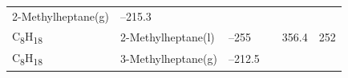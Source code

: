 \documentclass[
]{book}
\theoremstyle{definition}
\theoremstyle{definition}
\theoremstyle{definition}
\theoremstyle{remark}
\begin{document}
\begin{longtable}[]{@{}llllll@{}}
\begin{minipage}[t]{0.17\columnwidth}
2-Methylheptane(g)\strut
\end{minipage} & \begin{minipage}[t]{0.15\columnwidth}\raggedright
--215.3\strut
\end{minipage} & \begin{minipage}[t]{0.15\columnwidth}\raggedright
\strut
\end{minipage} & \begin{minipage}[t]{0.14\columnwidth}\raggedright
\strut
\end{minipage} & \begin{minipage}[t]{0.14\columnwidth}\raggedright
\strut
\end{minipage}\tabularnewline
\begin{minipage}[t]{0.07\columnwidth}\raggedright
C\textsubscript{8}H\textsubscript{18}\strut
\end{minipage} & \begin{minipage}[t]{0.17\columnwidth}\raggedright
2-Methylheptane(l)\strut
\end{minipage} & \begin{minipage}[t]{0.15\columnwidth}\raggedright
--255\strut
\end{minipage} & \begin{minipage}[t]{0.15\columnwidth}\raggedright
\strut
\end{minipage} & \begin{minipage}[t]{0.14\columnwidth}\raggedright
356.4\strut
\end{minipage} & \begin{minipage}[t]{0.14\columnwidth}\raggedright
252\strut
\end{minipage}\tabularnewline
\begin{minipage}[t]{0.07\columnwidth}\raggedright
C\textsubscript{8}H\textsubscript{18}\strut
\end{minipage} & \begin{minipage}[t]{0.17\columnwidth}\raggedright
3-Methylheptane(g)\strut
\end{minipage} & \begin{minipage}[t]{0.15\columnwidth}\raggedright
--212.5\strut
\end{minipage} & \begin{minipage}[t]{0.15\columnwidth}\raggedright
\strut
\end{minipage} & \begin{minipage}[t]{0.14\columnwidth}\raggedright
\strut
\end{minipage} & \begin{minipage}[t]{0.14\columnwidth}\raggedright

\end{minipage}
\end{longtable}
\end{document}
